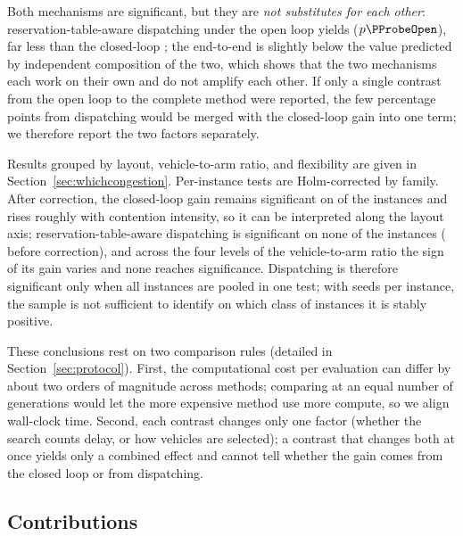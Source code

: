 Both mechanisms are significant, but they are \emph{not substitutes for each other}: reservation-table-aware dispatching under the open loop yields \GainProbeOpen{} ($p\PProbeOpen$), far less than the closed-loop \GainLoopRule{}; the end-to-end \GainEndToEnd{} is slightly below the value \GainIndepProduct{} predicted by independent composition of the two, which shows that the two mechanisms each work on their own and do not amplify each other.
If only a single contrast from the open loop to the complete method were reported, the few percentage points from dispatching would be merged with the closed-loop gain into one term; we therefore report the two factors separately.

Results grouped by layout, vehicle-to-arm ratio, and flexibility are given in Section~\ref{sec:whichcongestion}.
Per-instance tests are Holm-corrected by family.
After correction, the closed-loop gain remains significant on \CellsSigLoopAdj{} of the \NCases{} instances and rises roughly with contention intensity, so it can be interpreted along the layout axis; reservation-table-aware dispatching is significant on none of the instances (\CellsSigProbe{} before correction), and across the four levels of the vehicle-to-arm ratio the sign of its gain varies and none reaches significance.
Dispatching is therefore significant only when all instances are pooled in one test; with \NSeeds{} seeds per instance, the sample is not sufficient to identify on which class of instances it is stably positive.

These conclusions rest on two comparison rules (detailed in Section~\ref{sec:protocol}). First, the computational cost per evaluation can differ by about two orders of magnitude across methods; comparing at an equal number of generations would let the more expensive method use more compute, so we align wall-clock time.
Second, each contrast changes only one factor (whether the search counts delay, or how vehicles are selected); a contrast that changes both at once yields only a combined effect and cannot tell whether the gain comes from the closed loop or from dispatching.

\subsection{Contributions}

